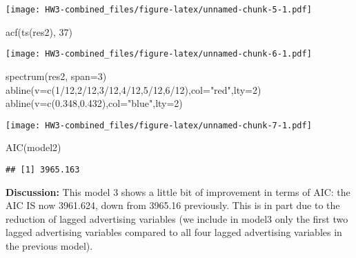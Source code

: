 \documentclass[
]{article}
\newenvironment{Shaded}{\begin{snugshade}}{\end{snugshade}}
\newcommand{\AttributeTok}[1]{\textcolor[rgb]{0.77,0.63,0.00}{#1}}
\newcommand{\DecValTok}[1]{\textcolor[rgb]{0.00,0.00,0.81}{#1}}
\newcommand{\FloatTok}[1]{\textcolor[rgb]{0.00,0.00,0.81}{#1}}
\newcommand{\FunctionTok}[1]{\textcolor[rgb]{0.00,0.00,0.00}{#1}}
\newcommand{\NormalTok}[1]{#1}
\newcommand{\SpecialCharTok}[1]{\textcolor[rgb]{0.00,0.00,0.00}{#1}}
\newcommand{\StringTok}[1]{\textcolor[rgb]{0.31,0.60,0.02}{#1}}
\begin{document}
\texttt{[image: HW3-combined\_files/figure-latex/unnamed-chunk-5-1.pdf]}

\begin{Shaded}
\begin{Highlighting}[]
\FunctionTok{acf}\NormalTok{(}\FunctionTok{ts}\NormalTok{(res2), }\DecValTok{37}\NormalTok{)}
\end{Highlighting}
\end{Shaded}

\texttt{[image: HW3-combined\_files/figure-latex/unnamed-chunk-6-1.pdf]}

\begin{Shaded}
\begin{Highlighting}[]
\FunctionTok{spectrum}\NormalTok{(res2, }\AttributeTok{span=}\DecValTok{3}\NormalTok{)}
\FunctionTok{abline}\NormalTok{(}\AttributeTok{v=}\FunctionTok{c}\NormalTok{(}\DecValTok{1}\SpecialCharTok{/}\DecValTok{12}\NormalTok{,}\DecValTok{2}\SpecialCharTok{/}\DecValTok{12}\NormalTok{,}\DecValTok{3}\SpecialCharTok{/}\DecValTok{12}\NormalTok{,}\DecValTok{4}\SpecialCharTok{/}\DecValTok{12}\NormalTok{,}\DecValTok{5}\SpecialCharTok{/}\DecValTok{12}\NormalTok{,}\DecValTok{6}\SpecialCharTok{/}\DecValTok{12}\NormalTok{),}\AttributeTok{col=}\StringTok{"red"}\NormalTok{,}\AttributeTok{lty=}\DecValTok{2}\NormalTok{)}
\FunctionTok{abline}\NormalTok{(}\AttributeTok{v=}\FunctionTok{c}\NormalTok{(}\FloatTok{0.348}\NormalTok{,}\FloatTok{0.432}\NormalTok{),}\AttributeTok{col=}\StringTok{"blue"}\NormalTok{,}\AttributeTok{lty=}\DecValTok{2}\NormalTok{)}
\end{Highlighting}
\end{Shaded}

\texttt{[image: HW3-combined\_files/figure-latex/unnamed-chunk-7-1.pdf]}

\begin{Shaded}
\begin{Highlighting}[]
\FunctionTok{AIC}\NormalTok{(model2)}
\end{Highlighting}
\end{Shaded}

\begin{verbatim}
## [1] 3965.163
\end{verbatim}

\textbf{Discussion:} This model 3 shows a little bit of improvement in
terms of AIC: the AIC IS now 3961.624, down from 3965.16 previously.
This is in part due to the reduction of lagged advertising variables (we
include in model3 only the first two lagged advertising variables
compared to all four lagged advertising variables in the previous
model).
\end{document}
